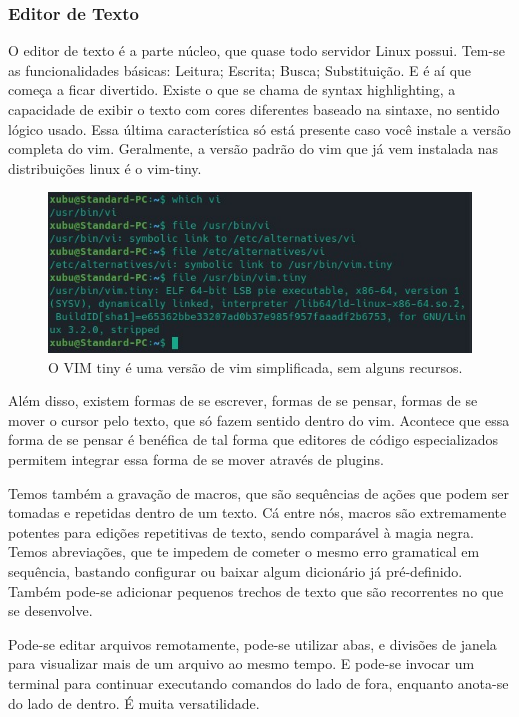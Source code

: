 \subsubsection{Editor de Texto}
O editor de texto é a parte núcleo, que quase todo servidor Linux possui.
Tem-se as funcionalidades básicas: Leitura; Escrita; Busca; Substituição.
E é aí que começa a ficar divertido.
Existe o que se chama de syntax highlighting, a capacidade de exibir o texto
com cores diferentes baseado na sintaxe, no sentido lógico usado.
Essa última característica só está presente caso você instale a versão completa do vim.
Geralmente, a versão padrão do vim que já vem instalada nas distribuições linux é o vim-tiny.

\begin{figure}[!h]
\centering
\includegraphics[scale=0.9]{motivacao/VimTiny.jpg}
\caption{O VIM tiny é uma versão de vim simplificada, sem alguns recursos.}
\end{figure}

Além disso, existem formas de se escrever, formas de se pensar, formas de se
mover o cursor pelo texto, que só fazem sentido dentro do vim.
Acontece que essa forma de se pensar é benéfica de tal forma que
editores de código especializados permitem integrar essa forma de se mover através de plugins.

Temos também a gravação de macros, que são sequências de ações que podem ser
tomadas e repetidas dentro de um texto.
Cá entre nós, macros são extremamente potentes para edições repetitivas de texto,
sendo comparável à magia negra.
Temos abreviações, que te impedem de cometer o mesmo erro gramatical em sequência,
bastando configurar ou baixar algum dicionário já pré-definido.
Também pode-se adicionar pequenos trechos de texto que são recorrentes no que se desenvolve.

Pode-se editar arquivos remotamente, pode-se utilizar abas,
e divisões de janela para visualizar mais de um arquivo ao mesmo tempo.
E pode-se invocar um terminal para continuar executando comandos do lado de fora,
enquanto anota-se do lado de dentro.
É muita versatilidade.

